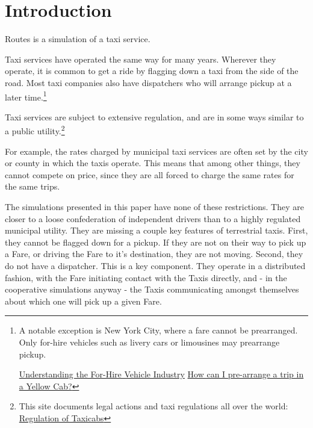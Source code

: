 \documentclass[11pt,letterpaper,onecolumn,twoside,openright,draft]{report}
\begin{document}
\setcounter{page}{2}

\chapter{Introduction}

Routes is a simulation of a taxi service.

Taxi services have operated the same way for many years.
Wherever they operate, it is common to get a ride by flagging down a taxi from the side of the road.
Most taxi companies also have dispatchers who will arrange pickup at a later time.\footnote{A notable exception is New York City, where a fare cannot be prearranged.
Only for-hire vehicles such as livery cars or limousines may prearrange pickup.

{\hyperlink{http://www.nyc.gov/html/tlc/downloads/pdf/fhv_base_fact_sheet.pdf}{Understanding the For-Hire Vehicle Industry}}
\hyperlink{http://www.nyc.gov/html/tlc/html/passenger/faq_pass.shtml\#14} {How can I pre-arrange a trip in a Yellow Cab?}}


Taxi services are subject to extensive regulation, and are in some ways similar to a public utility.\footnote{This site documents legal actions and taxi regulations all over the world: {\hyperlink{http://www.taxi-library.org/regulation.htm}{Regulation of Taxicabs}}}

For example, the rates charged by municipal taxi services are often set by the city or county in which the taxis operate.
This means that among other things, they cannot compete on price, since they are all forced to charge the same rates for the same trips.

The simulations presented in this paper have none of these restrictions.
They are closer to a loose confederation of independent drivers than to a highly regulated municipal utility.
They are missing a couple key features of terrestrial taxis.
First, they cannot be flagged down for a pickup.
If they are not on their way to pick up a Fare, or driving the Fare to it's destination, they are not moving.
Second, they do not have a dispatcher.
This is a key component.
They operate in a distributed fashion, with the Fare initiating contact with the Taxis directly, and - in the cooperative simulations anyway - the Taxis communicating amongst themselves about which one will pick up a given Fare.
\end{document}
